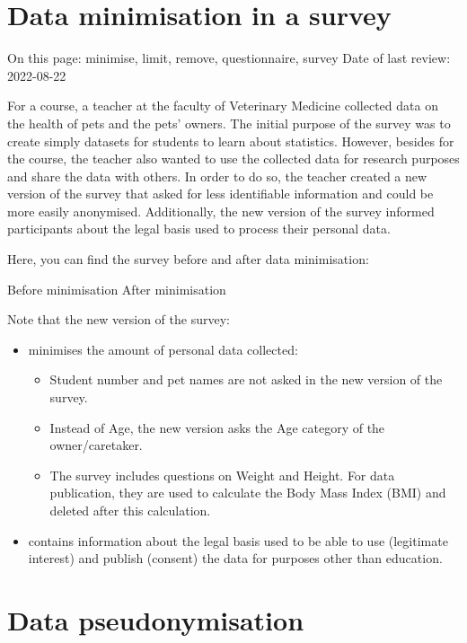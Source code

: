 \documentclass[
]{book}
\providecommand{\tightlist}{%
  \setlength{\itemsep}{0pt}\setlength{\parskip}{0pt}}
\begin{document}
\hypertarget{pet-survey}{%
\chapter{Data minimisation in a survey}\label{pet-survey}}

On this page: minimise, limit, remove, questionnaire, survey
Date of last review: 2022-08-22

For a course, a teacher at the faculty of Veterinary Medicine collected data on
the health of pets and the pets' owners. The initial purpose of the survey was
to create simply datasets for students to learn about statistics. However,
besides for the course, the teacher also wanted to use the collected data for
research purposes and share the data with others. In order to do so, the teacher
created a new version of the survey that asked for less identifiable information
and could be more easily anonymised. Additionally, the new version of the survey
informed participants about the legal basis used to process their personal data.

Here, you can find the survey before and after data minimisation:

Before minimisation
After minimisation

Note that the new version of the survey:

\begin{itemize}
\tightlist
\item
  minimises the amount of personal data collected:

  \begin{itemize}
  \tightlist
  \item
    Student number and pet names are not asked in the new version of the survey.
  \item
    Instead of Age, the new version asks the Age category of the owner/caretaker.
  \item
    The survey includes questions on Weight and Height. For data publication,
    they are used to calculate the Body Mass Index (BMI) and deleted after this
    calculation.
  \end{itemize}
\item
  contains information about the legal basis used to be able to use (legitimate
  interest) and publish (consent) the data for purposes other than education.
\end{itemize}

\hypertarget{youth-pseudonymisation}{%
\chapter{Data pseudonymisation}\label{youth-pseudonymisation}}
\end{document}
